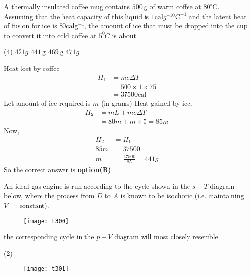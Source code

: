 \begin{questions}
\begin{minipage}{\textwidth}
	\question A thermally insulated coffee mug contains $500 \mathrm{~g}$ of warm coffee at $80^{\circ} \mathrm{C}$. Assuming that the heat capacity of this liquid is $1 \mathrm{cal} g^{-10} \mathrm{C}^{-1}$ and the latent heat of fusion for ice is $80 \mathrm{cal} \mathrm{g}^{-1}$, the amount of ice that must be dropped into the cup to convert it into cold coffee at $5^{0} C$ is about
\end{minipage}
\begin{tasks}(4)
	\task[\textbf{A.}] $421 g$
	\task[\textbf{B.}] $441 \mathrm{~g}$
	\task[\textbf{C.}]   $469 \mathrm{~g}$
	\task[\textbf{D.}] $471 g$
\end{tasks}
\begin{answer}
	Heat lost by coffee
	$$
	\begin{aligned}
	H_{1} &=m c \Delta T \\
	&=500 \times 1 \times 75 \\
	&=37500 \mathrm{cal}
	\end{aligned}
	$$
	Let amount of ice required is $m$ (in grams)
	Heat gained by ice,
	$$
	\begin{aligned}
	H_{2} &=m L+m c \Delta T \\
	&=80 m+m \times 5=85 m
	\end{aligned}
	$$
	Now,
	$$
	\begin{aligned}
	H_{2} &=H_{1} \\
	85 m &=37500 \\
	m &=\frac{37500}{85}=441 g
	\end{aligned}
	$$
	So the correct answer is \textbf{option(B)}
\end{answer}
\begin{minipage}{\textwidth}
	\question An ideal gas engine is run according to the cycle shown in the $s-T$ diagram below, where the process from $D$ to $A$ is known to be isochoric (i.e. maintaining $V=$ constant).\\
	\begin{figure}[H]
		\centering
		\texttt{[image: t300]}
	\end{figure}
	the corresponding cycle in the $p-V$ diagram will most closely resemble
\end{minipage}
\begin{tasks}(2)
	\task[\textbf{A.}] \begin{figure}[H]
		\centering
		\texttt{[image: t301]}
	\end{figure}

\end{tasks}
\end{questions}
